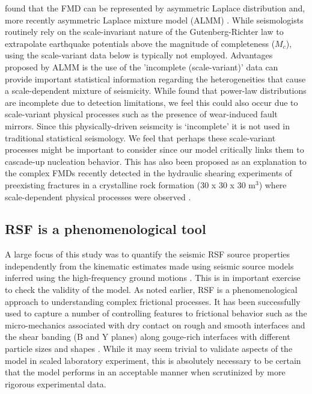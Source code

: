 \documentclass[preprint,1p, 10pt,authoryear]{elsarticle}
\begin{document}
\citet{Mignan2012} found that the FMD can be represented by asymmetric Laplace distribution and, more recently asymmetric Laplace mixture model (ALMM) \citet{Mignan2020}. While seismologists routinely rely on the scale-invariant nature of the Gutenberg-Richter law to extrapolate earthquake potentials above the magnitude of completeness ($M_{c}$), using the scale-variant data below is typically not employed. Advantages proposed by ALMM is the use of the 'incomplete (scale-variant)' data can provide important statistical information regarding the heterogeneities that cause a scale-dependent mixture of seismicity. While \citet{Mignan2020} found that power-law distributions are incomplete due to detection limitations, we feel this could also occur due to scale-variant physical processes such as the presence of wear-induced fault mirrors. Since this physically-driven seismcity is `incomplete' it is not used in traditional statistical seismology. We feel that perhaps these scale-variant processes might be important to consider since our model critically links them to cascade-up nucleation behavior. This has also been proposed as an explanation to the complex FMDs recently detected in the hydraulic shearing experiments of preexisting fractures in a crystalline rock formation (30 x 30 x 30 m$^{3}$) where scale-dependent physical processes were observed \citep{Villiger2019}.

\subsection{RSF is a phenomenological tool}
A large focus of this study was to quantify the seismic RSF source properties independently from the kinematic estimates made using seismic source models inferred using the high-frequency ground motions \citep{Selvadurai2019}. This is in important exercise to check the validity of the model. As noted earlier, RSF is a phenomenological approach to understanding complex frictional processes.  It has been successfully used to capture a number of controlling features to frictional behavior such as the micro-mechanics associated with dry contact on rough and smooth interfaces \citep{Marone1973, Marone1998,Dieterich1981,Yoshioka1997} and the shear banding (B and Y planes) along gouge-rich interfaces with different particle sizes and shapes \citep{Marone1993, Anthony2005,Scuderi2017}. While it may seem trivial to validate aspects of the model in scaled laboratory experiment, this is absolutely necessary to be certain that the model performs in an acceptable manner when scrutinized by more rigorous experimental data.
\end{document}
